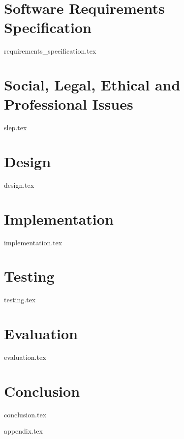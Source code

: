 \documentclass[a4paper, 12pt, oneside]{book}
\begin{document}
\chapter{Software Requirements Specification}
{requirements_specification.tex}

\chapter{Social, Legal, Ethical and Professional Issues}
{slep.tex}

\chapter{Design}
{design.tex}

\chapter{Implementation}
{implementation.tex}

\chapter{Testing}
{testing.tex}

\chapter{Evaluation}
{evaluation.tex}

\chapter{Conclusion}
{conclusion.tex}

\backmatter

\setcounter{page}{1} %



\setlength{} %
\printbibliography[heading=bibintoc, title = {References}]



\appendix
\renewcommand{\thechapter}{\alph{chapter}}
{appendix.tex}
\end{document}

